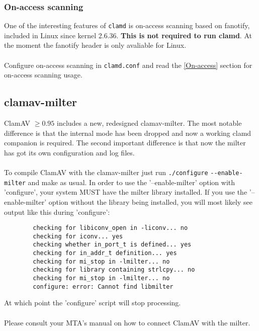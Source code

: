 \documentclass[a4paper,titlepage,12pt]{article}
\begin{document}
    \subsubsection{On-access scanning}
    One of the interesting features of \verb+clamd+ is on-access scanning
    based on fanotify, included in Linux since kernel 2.6.36.
    \textbf{This is not required to run clamd}. At the moment the fanotify header is
    only avaliable for Linux.
    \\\\
    Configure on-access scanning in \verb+clamd.conf+ and read the 
    \ref{On-access} section for on-access scanning usage.

    \subsection{clamav-milter}\label{sec:clamavmilter}
    ClamAV $\ge0.95$ includes a new, redesigned clamav-milter. The most notable
    difference is that the internal mode has been dropped and now a working
    clamd companion is required. The second important difference is that now
    the milter has got its own configuration and log files. 
    \\\\
    To compile ClamAV with the clamav-milter just run \verb+./configure+
    \verb+--enable-milter+ and make as usual. In order to use the 
    '--enable-milter' option with 'configure', your system MUST have the milter 
    library installed.  If you use the '--enable-milter' option without the 
    library being installed, you will most likely see output like this during 
    'configure':
    \begin{verbatim}
        checking for libiconv_open in -liconv... no
        checking for iconv... yes
        checking whether in_port_t is defined... yes
        checking for in_addr_t definition... yes
        checking for mi_stop in -lmilter... no
        checking for library containing strlcpy... no
        checking for mi_stop in -lmilter... no
        configure: error: Cannot find libmilter
    \end{verbatim}
    At which point the 'configure' script will stop processing.
    \\\\
    Please consult your MTA's manual on how to connect ClamAV with the milter.
\end{document}
